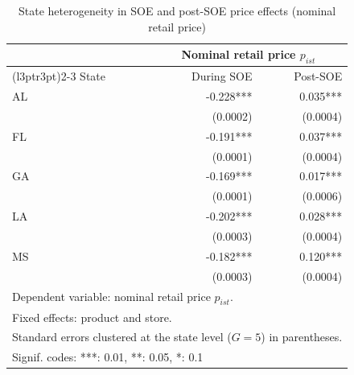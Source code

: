 \begin{table}[!h]
\centering
\caption{\label{tab:tab:price_reg_state_heterog}State heterogeneity in SOE and post-SOE price effects (nominal retail price)}
\centering
\begin{tabular}[t]{lrr}
\toprule
\multicolumn{1}{c}{ } & \multicolumn{2}{c}{Nominal retail price $p_{ist}$} \\
\cmidrule(l{3pt}r{3pt}){2-3}
State & During SOE & Post-SOE\\
\midrule
AL & -0.228*** & 0.035***\\
 & (0.0002) & (0.0004)\\
FL & -0.191*** & 0.037***\\
 & (0.0001) & (0.0004)\\
GA & -0.169*** & 0.017***\\
\addlinespace
 & (0.0001) & (0.0006)\\
LA & -0.202*** & 0.028***\\
 & (0.0003) & (0.0004)\\
MS & -0.182*** & 0.120***\\
 & (0.0003) & (0.0004)\\
\bottomrule
\multicolumn{3}{l}{\rule{0pt}{1em}Dependent variable: nominal retail price $p_{ist}$.}\\
\multicolumn{3}{l}{\rule{0pt}{1em}Fixed effects: product and store.}\\
\multicolumn{3}{l}{\rule{0pt}{1em}Standard errors clustered at the state level ($G = 5$) in parentheses.}\\
\multicolumn{3}{l}{\rule{0pt}{1em}Signif. codes: ***: 0.01, **: 0.05, *: 0.1}\\
\end{tabular}
\end{table}
